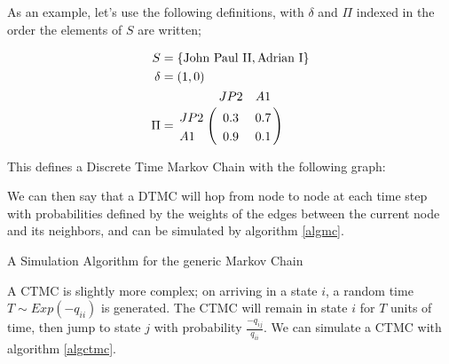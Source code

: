 As an example, let's use the following definitions, with $\delta$ and $\Pi$ indexed in the order the elements of $S$ are written;

\begin{align*}
S &= \{\mbox{John Paul II}, \mbox{Adrian I}\}\\
\delta &= \left(1,0\right)\\
\Pi &=
\bordermatrix{      & JP2&A1 \cr
                JP2 & 0.3 &  0.7 \cr
                A1  & 0.9 &  0.1 
			}
\end{align*}

This defines a Discrete Time Markov Chain with the following graph:



We can then say that a DTMC will hop from node to node at each time step with probabilities defined by the weights of the edges between the current node and its neighbors, and can be simulated by algorithm \ref{algmc}.

\begin{algorithm}
\SetAlgoLined
{}

\caption{A Simulation Algorithm for the generic Markov Chain}\label{algmc}

\end{algorithm}

A CTMC is slightly more complex; on arriving in a state $i$, a random time $T \sim Exp(-q_{ii})$ is generated. The CTMC will remain in state $i$ for $T$ units of time, then jump to state $j$ with probability $\frac{-q_{ij}}{q_{ii}}$. We can simulate a CTMC with algorithm \ref{algctmc}.

